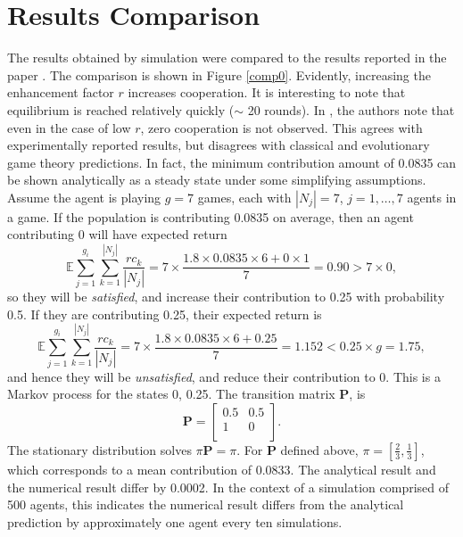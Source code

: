 \section{Results Comparison}
The results obtained by simulation were compared to the results reported in the paper \cite{RN49}. The comparison is shown in Figure \ref{comp0}. Evidently, increasing the enhancement factor $r$ increases cooperation. It is interesting to note that equilibrium is reached relatively quickly ($\sim$ 20 rounds). In \cite{RN49}, the authors note that even in the case of low $r$, zero cooperation is not observed. This agrees with experimentally reported results, but disagrees with classical and evolutionary game theory predictions. In fact, the minimum contribution amount of 0.0835 can be shown analytically as a steady state under some simplifying assumptions.\\

Assume the agent is playing $g=7$ games, each with $|N_j|=7$, $j=1, \dots, 7$ agents in a game. If the population is contributing 0.0835 on average, then  an agent contributing 0 will have expected return $$ \mathbb E \sum_{j=1}^{g_i} \sum_{k=1}^{|N_j|} \frac{rc_k}{|N_j|} =   7\times\frac{1.8\times0.0835\times6 + 0\times1}{7} =  0.90 >7\times0,$$ so they will be \emph{satisfied}, and increase their contribution to 0.25 with probability 0.5. If they are contributing 0.25, their expected return is 
$$ \mathbb E \sum_{j=1}^{g_i} \sum_{k=1}^{|N_j|} \frac{rc_k}{|N_j|} =7\times \frac{1.8\times0.0835\times6 + 0.25}{7} = 1.152< 0.25\times g  =1.75, $$
 and hence they will be \emph{unsatisfied}, and reduce their contribution to 0. This is a Markov process for the states 0, 0.25. The transition matrix $\mathbf{P}$, is $$\mathbf P = \begin{bmatrix} 0.5& 0.5 \\
1& 0 \\
\end{bmatrix}. $$ The stationary distribution solves $\pi \mathbf{P} = \pi$. For $\mathbf{P}$ defined above, $\pi = [\tfrac{2}{3}, \tfrac{1}{3}]$, which corresponds to a mean contribution of 0.0833. The analytical result and the numerical result differ by 0.0002. In the context of a simulation comprised of 500 agents, this indicates the numerical result differs from the analytical prediction by approximately one agent every ten simulations. \\

